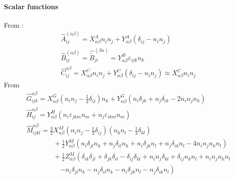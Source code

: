 \documentclass[11pt]{scrartcl}
\begin{document}
\paragraph{Scalar functions}

From \citet{Jeffrey_1984}:
\begin{align}
  &\hat{A}_{ij}^{(\alpha \beta)}
   = 
  X_{\alpha \beta}^{A} n_i n_j
  +
  Y_{\alpha \beta}^{A} (\delta_{ij} - n_i n_j) \\
  & \hat{B}_{ij}^{(\alpha \beta)}
  =
  \hat{\tilde{B}}_{ji}^{(\beta\alpha)}
  = 
  Y_{\alpha \beta}^{B}   \varepsilon_{ijk} n_k\\
  &\hat{C}_{ij}^{\alpha \beta}
  = 
  X_{\alpha \beta}^{C} n_i n_j
  +
  Y_{\alpha \beta}^{C} (\delta_{ij} - n_i n_j)
 \approx
  X_{\alpha \beta}^{C} n_i n_j
\end{align}
From \citet{Jeffrey_1992}
\begin{align}
& \hat{G}_{ijk}^{\alpha \beta}
 = 
X_{\alpha\beta}^{G} 
\left(n_i n_j - \frac{1}{3}\delta_{ij}\right)n_k
+
Y_{\alpha\beta}^{G}
\left(
n_i \delta_{jk} + n_j \delta_{ik} - 2 n_i n_j n_k
\right) \\
& 
\hat{H}_{ij}^{\alpha\beta}
 = Y_{\alpha\beta}^{H}
(n_i \varepsilon_{jkm} n_m 
+ n_j \varepsilon_{ikm} n_m )\\
&
 \hat{M}_{ijkl}^{\alpha\beta}
=  \frac{3}{2}
X_{\alpha\beta}^{M}
 \left(n_i n_j
 - \frac{1}{3} \delta_{ij}
\right)
 \left(n_k n_l
 - \frac{1}{3} \delta_{kl}
\right) \\
&\qquad\qquad
+
\frac{1}{2} 
Y_{\alpha\beta}^{M}
\left(
n_i \delta_{jl} n_k
+
n_j \delta_{il} n_k
+
n_i \delta_{jk} n_l
+
n_j \delta_{ik} n_l
-
4 n_i n_j n_k n_l
\right) \\
&\qquad\qquad
+ 
\frac{1}{2}
Z_{\alpha\beta}^{M}
\left(
\delta_{ik}\delta_{jl}
+
\delta_{jk}\delta_{il}
-
\delta_{ij}\delta_{kl}
+
n_i n_j \delta_{kl} 
+
\delta_{ij} n_k n_l
+
n_i n_j n_k n_l \right.\\
&\qquad \qquad \quad
\left.
- 
n_i \delta_{jl} n_k
-
n_j \delta_{il} n_k
-
n_i \delta_{jk} n_l
-
n_j \delta_{ik} n_l
\right) 
\end{align}
\end{document}

